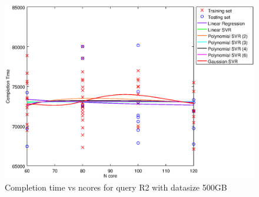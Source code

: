 
\begin {figure}[hbtp]
\centering
\includegraphics[width=\textwidth]{output/R2_500_ONLY_1_OVER_NCORES/plot_R2_500.eps}
\caption{Completion time vs ncores for query R2 with datasize 500GB}
\label{fig:all_nonlinear_R2_500}
\end {figure}
